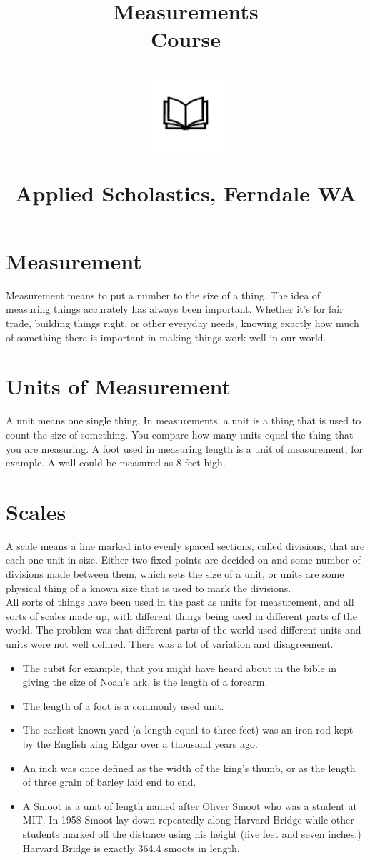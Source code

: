 \documentclass{article}
\author{}
\date{}
\title{\textbf{Measurements\\ Course}\\
\vspace{28pt}
\begin{center}
\includegraphics[width=4em]{ApS_logo.png}
\end{center}
\begin{normalsize}
Applied Scholastics, Ferndale WA
\end{normalsize}}
\begin{document}
\maketitle

\section*{Measurement}
Measurement means to put a number to the size of a thing. The idea of measuring things accurately has always been important. Whether it's for fair trade, building things right, or other everyday needs, knowing exactly how much of something there is important in making things work well in our world.

\section*{Units of Measurement}
A unit means one single thing. In measurements, a unit is a thing that is used to count the size of something. You compare how many units equal the thing that you are measuring. A foot used in measuring length is a unit of measurement, for example. A wall could be measured as 8 feet high.

\section*{Scales}
A scale means a line marked into evenly spaced sections, called divisions, that are each one unit in size. Either two fixed points are decided on and some number of divisions made between them, which sets the size of a unit, or units are some physical thing of a known size that is used to mark the divisions.\\

All sorts of things have been used in the past as units for measurement, and all sorts of scales made up, with different things being used in different parts of the world. The problem was that different parts of the world used different units and units were not well defined. There was a lot of variation and disagreement.

\begin{itemize}
\item The cubit for example, that you might have heard about in the bible in giving the size of Noah's ark, is the length of a forearm.
\item The length of a foot is a commonly used unit.
\item The earliest known yard (a length equal to three feet) was an iron rod kept by the English king Edgar over a thousand years ago.
\item An inch was once defined as the width of the king's thumb, or as the length of three grain of barley laid end to end.
\item A Smoot is a unit of length named after Oliver Smoot who was a student at MIT. In 1958 Smoot lay down repeatedly along Harvard Bridge while other students marked off the distance using his height (five feet and seven inches.) Harvard Bridge is exactly 364.4 smoots in length.
\end{itemize}
\end{document}
